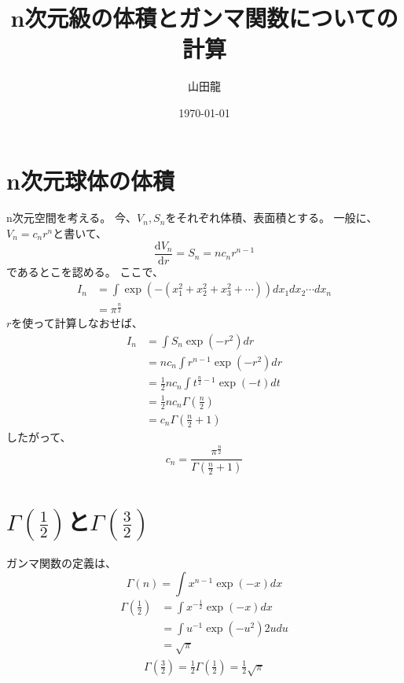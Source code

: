\documentclass{jsarticle}
\date{\today}
\author{山田龍}
\title{n次元級の体積とガンマ関数についての計算}
\newcommand{\dder}[2][]{\frac{\mathrm{d}#1}{\mathrm{d}#2}}
\newcommand{\half}{\frac{1}{2}}
\begin{document}
\maketitle
\section{n次元球体の体積}
n次元空間を考える。
今、$V_n,S_n$をそれぞれ体積、表面積とする。
一般に、$V_n = c_n r^n$と書いて、
\begin{equation}
    \dder[V_n]{r} = S_n = n c_n r^{n-1}
\end{equation}
であるとこを認める。
ここで、
\begin{align}
    I_n &= \int \exp(-(x_1^2 + x_2^2 + x_3^2 + \cdots))dx_1 dx_2 \cdots dx_n\\
        &= \pi^{\frac{n}{2}}
\end{align}
$r$を使って計算しなおせば、
\begin{align}
    I_n &= \int S_n \exp(-r^2)dr\\
        &= n c_n \int r^{n-1} \exp(-r^2)dr\\
        &= \half n c_n \int t^{\frac{n}{2}-1} \exp(-t)dt\\
        &= \half n c_n \Gamma(\frac{n}{2})\\
        &=  c_n \Gamma(\frac{n}{2} + 1)
\end{align}
したがって、
\begin{equation}
    c_n = \frac{\pi^{\frac{n}{2}}}
{\Gamma(\frac{n}{2} + 1)}\end{equation}

\section{$\Gamma(\half)$と$\Gamma(\frac{3}{2})$}
ガンマ関数の定義は、
\begin{equation}
    \Gamma(n) = \int x^{n-1} \exp(-x)dx
\end{equation}
\begin{align}
    \Gamma(\half) &= \int x^{-\half} \exp(-x)dx\\
                  &= \int u^{-1} \exp(-u^2) 2u du\\
                  &= \sqrt{\pi}
\end{align}
\begin{align}
    \Gamma(\frac{3}{2}) = \half \Gamma(\half) = \half \sqrt{\pi}
\end{align}
\end{document}

